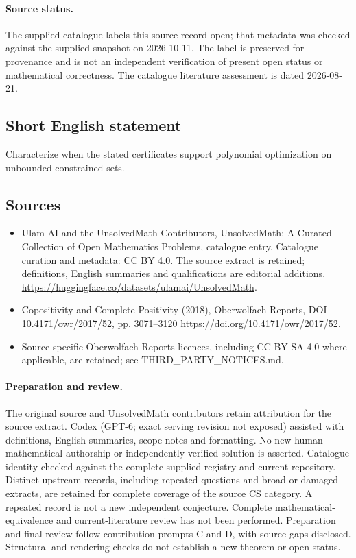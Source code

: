 \documentclass[11pt]{article}
\begin{document}
\paragraph{Source status.}
The supplied catalogue labels this source record open; that metadata was checked against the supplied snapshot on 2026-10-11. The label is preserved for provenance and is not an independent verification of present open status or mathematical correctness. The catalogue literature assessment is dated 2026-08-21.
\subsection{Short English statement}
Characterize when the stated certificates support polynomial optimization on unbounded constrained sets.
\subsection{Sources}
\begin{itemize}
\item[S1] Ulam AI and the UnsolvedMath Contributors, UnsolvedMath: A Curated Collection of Open Mathematics Problems, catalogue entry. Catalogue curation and metadata: CC BY 4.0. The source extract is retained; definitions, English summaries and qualifications are editorial additions.
\url{https://huggingface.co/datasets/ulamai/UnsolvedMath}.
\item[S2] Copositivity and Complete Positivity (2018), Oberwolfach Reports, DOI 10.4171/owr/2017/52, pp. 3071--3120
\url{https://doi.org/10.4171/owr/2017/52}.
\item Source-specific Oberwolfach Reports licences, including CC BY-SA 4.0 where applicable, are retained; see THIRD\_PARTY\_NOTICES.md.
\end{itemize}
\paragraph{Preparation and review.}
The original source and UnsolvedMath contributors retain attribution for the source extract. Codex (GPT-6; exact serving revision not exposed) assisted with definitions, English summaries, scope notes and formatting. No new human mathematical authorship or independently verified solution is asserted. Catalogue identity checked against the complete supplied registry and current repository. Distinct upstream records, including repeated questions and broad or damaged extracts, are retained for complete coverage of the source CS category. A repeated record is not a new independent conjecture. Complete mathematical-equivalence and current-literature review has not been performed. Preparation and final review follow contribution prompts C and D, with source gaps disclosed. Structural and rendering checks do not establish a new theorem or open status.
\label{end:statement}
\end{document}

